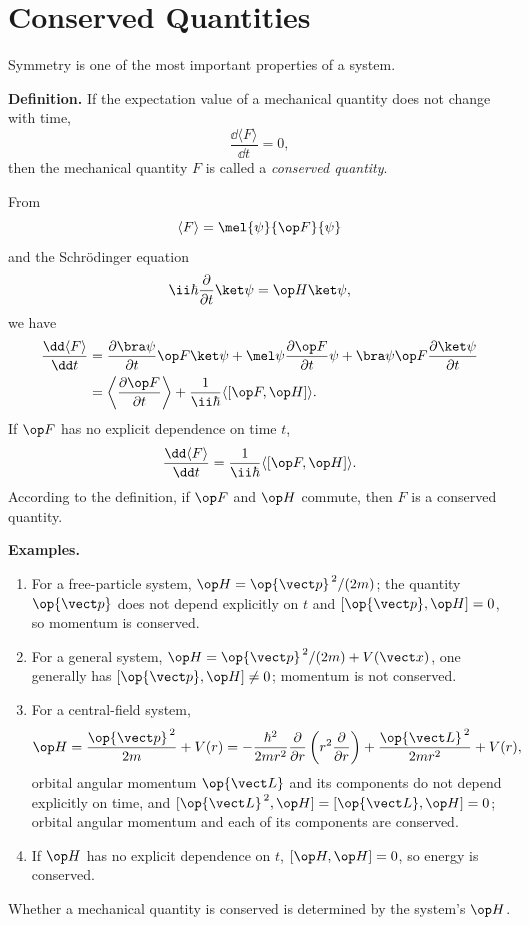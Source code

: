 \section{Conserved Quantities}
Symmetry is one of the most important properties of a system.

\textbf{Definition.} If the expectation value of a mechanical quantity does not change with time,
\[\frac{\dd\langle F\rangle}{\dd t}=0,\]
then the mechanical quantity $F$ is called a \emph{conserved quantity}.

From
\[\langle F\rangle=\mel{\psi}{\op F}{\psi}\]
and the Schr\"odinger equation
\[\ii\hbar\frac{\partial}{\partial t}\ket\psi=\op H\ket\psi,\]
we have
\begin{align*}
\frac{\dd\langle F\rangle}{\dd t}
&=\frac{\partial\bra\psi}{\partial t}\op F\ket\psi
 +\mel\psi{\frac{\partial\op F}{\partial t}}\psi
 +\bra\psi\op F\frac{\partial\ket\psi}{\partial t}\\
&=\left\langle\frac{\partial\op F}{\partial t}\right\rangle
 +\frac1{\ii\hbar}\langle[\op F,\op H]\rangle.
\end{align*}
If $\op F$ has no explicit dependence on time $t$,
\[\frac{\dd\langle F\rangle}{\dd t}=
\frac1{\ii\hbar}\langle[\op F,\op H]\rangle.\]
According to the definition, if $\op F$ and $\op H$ commute, then $F$ is a conserved quantity.

\textbf{Examples.}
\begin{enumerate}[label=\alph*)]
\item For a free-particle system, $\op H=\op{\vect p}^{\,2}/(2m)$; the quantity $\op{\vect p}$ does not depend explicitly on $t$ and $[\op{\vect p},\op H]=0$, so momentum is conserved.
\item For a general system, $\op H=\op{\vect p}^{\,2}/(2m)+V(\vect x)$, one generally has $[\op{\vect p},\op H]\ne0$; momentum is not conserved.
\item For a central-field system,
\[\op H=\frac{\op{\vect p}^{\,2}}{2m}+V(r)
=-\frac{\hbar^2}{2mr^2}\frac{\partial}{\partial r}
\left(r^2\frac{\partial}{\partial r}\right)
+\frac{\op{\vect L}^{\,2}}{2mr^2}+V(r),\]
orbital angular momentum $\op{\vect L}$ and its components do not depend explicitly on time, and $[\op{\vect L}^{\,2},\op H]=[\op{\vect L},\op H]=0$; orbital angular momentum and each of its components are conserved.
\item If $\op H$ has no explicit dependence on $t$, $[\op H,\op H]=0$, so energy is conserved.
\end{enumerate}
Whether a mechanical quantity is conserved is determined by the system's $\op H$.

